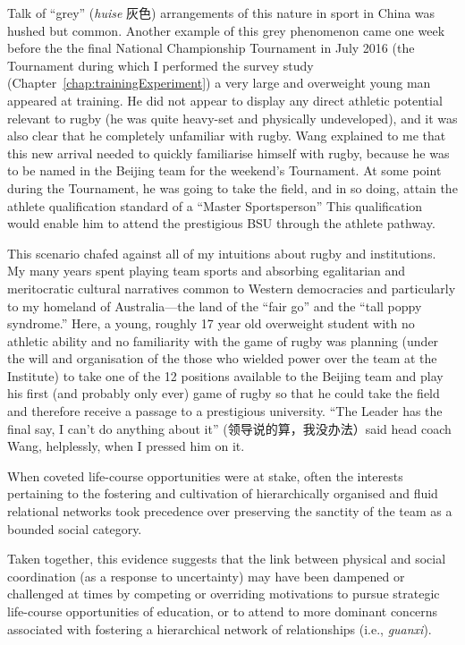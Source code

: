 \begin{CJK}{UTF8}{gbsn}
Talk of ``grey'' (\textit{huise} 灰色) arrangements of this nature in sport in China was hushed but common.  Another example of this grey phenomenon came one week before the the final National Championship Tournament in July 2016 (the Tournament during which I performed the survey study (Chapter~\ref{chap:trainingExperiment}) a very large and overweight young man appeared at training.  He did not appear to display any direct athletic potential relevant to rugby (he was quite heavy-set and physically undeveloped), and it was also clear that he completely unfamiliar with rugby. Wang explained to me that this new arrival needed to quickly familiarise himself with rugby, because he was to be named in the Beijing team for the weekend's Tournament.  At some point during the Tournament, he was going to take the field, and in so doing, attain the athlete qualification standard of a ``Master Sportsperson''  This qualification would enable him to attend the prestigious BSU through the athlete pathway.

This scenario chafed against all of my intuitions about rugby and institutions.  My many years spent playing team sports and absorbing egalitarian and meritocratic cultural narratives common to Western democracies and particularly to my homeland of Australia---the land of the ``fair go'' and the ``tall poppy syndrome.''  Here, a young, roughly 17 year old overweight student with no athletic ability and no familiarity with the game of rugby was planning (under the will and organisation of the those who wielded power over the team at the Institute) to take one of the 12 positions available to the Beijing team and play his first (and probably only ever) game of rugby so that he could take the field and therefore receive a passage to a prestigious university.  ``The Leader has the final say, I can't do anything about it'' (领导说的算，我没办法）said head coach Wang, helplessly, when I pressed him on it.

When coveted life-course opportunities were at stake, often the interests pertaining to the fostering and cultivation of hierarchically organised and fluid relational networks took precedence over preserving the sanctity of the team as a bounded social category.

Taken together, this evidence suggests that the link between physical and social coordination (as a response to uncertainty) may have been dampened or challenged at times by competing or overriding motivations to pursue strategic life-course opportunities of education, or to attend to more dominant concerns associated with fostering a hierarchical network of relationships (i.e., \textit{guanxi}).





\end{CJK}
